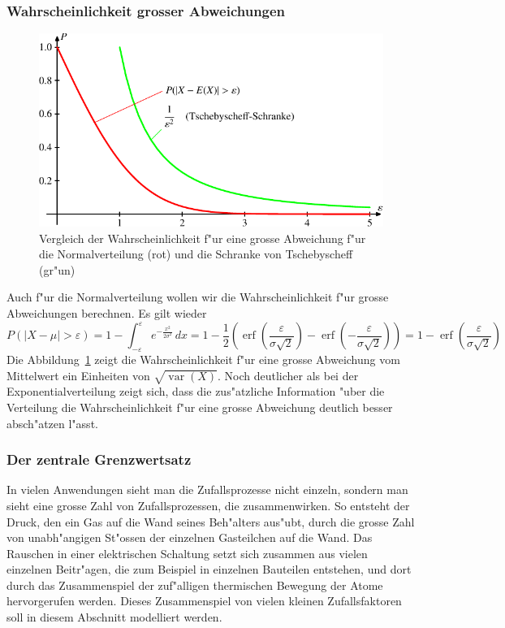 \subsubsection{Wahrscheinlichkeit grosser Abweichungen}
\begin{figure}
\begin{center}
\includegraphics{images/norm-1.pdf}
\end{center}
\caption{Vergleich der Wahrscheinlichkeit f"ur eine grosse Abweichung
f"ur die Normalverteilung (rot) und die Schranke von Tschebyscheff (gr"un)
\label{abweichung-normalverteilung}}
\end{figure}

Auch f"ur die Normalverteilung wollen wir die Wahrscheinlichkeit
f"ur grosse Abweichungen berechnen. Es gilt wieder
\[
P(|X-\mu|>\varepsilon)
=1-\int_{-\varepsilon}^{\varepsilon}e^{-\frac{x^2}{2\sigma^2}}\,dx
=
1-{\textstyle\frac12}(\operatorname{erf}({\textstyle\frac{\varepsilon}{\sigma\sqrt{2}}})-\operatorname{erf}({\textstyle-\frac{\varepsilon}{\sigma\sqrt{2}}}))
=
1-\operatorname{erf}({\textstyle\frac{\varepsilon}{\sigma\sqrt{2}}})
\]
Die Abbildung~\ref{abweichung-normalverteilung} zeigt die Wahrscheinlichkeit
f"ur eine grosse Abweichung vom Mittelwert ein Einheiten
von $\sqrt{\operatorname{var}(X)}$. Noch deutlicher als bei der
Exponentialverteilung zeigt sich, dass die zus"atzliche Information
"uber die Verteilung die Wahrscheinlichkeit f"ur eine grosse
Abweichung deutlich besser absch"atzen l"asst.

\subsubsection{Der zentrale Grenzwertsatz}
\label{zentraler-grenzwertsatz}
In vielen Anwendungen sieht man die Zufallsprozesse nicht einzeln, sondern
man sieht eine grosse Zahl von Zufallsprozessen, die zusammenwirken.
So entsteht der Druck, den ein Gas auf die Wand seines Beh"alters aus"ubt,
durch die grosse Zahl von unabh"angigen St"ossen der einzelnen Gasteilchen
auf die Wand. Das Rauschen in einer elektrischen Schaltung setzt sich
zusammen aus vielen einzelnen Beitr"agen, die zum Beispiel in einzelnen
Bauteilen entstehen, und dort durch das Zusammenspiel der zuf"alligen
thermischen Bewegung der Atome hervorgerufen werden.
Dieses Zusammenspiel von vielen kleinen Zufallsfaktoren soll in diesem
Abschnitt modelliert werden.

